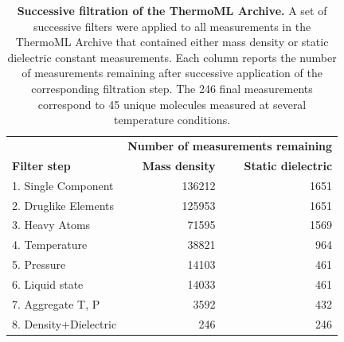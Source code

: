 \documentclass[journal=jacsat,manuscript=article]{achemso}
\begin{document}

\begin{table}
\begin{tabular}{lrr}
\hline
 &  \multicolumn{2}{c}{\bf Number of measurements remaining} \\ \cline{2-3}
{\bf Filter step} &  {\bf Mass density} &  {\bf Static dielectric} \\ 
\hline
1.  Single Component   &               136212 &                                     1651 \\
2.  Druglike Elements  &               125953 &                                     1651 \\
3.  Heavy Atoms        &                71595 &                                     1569 \\
4.  Temperature        &                38821 &                                      964 \\
5.  Pressure           &                14103 &                                      461 \\
6.  Liquid state       &                14033 &                                      461 \\
7.  Aggregate T, P     &                 3592 &                                      432 \\
8.  Density+Dielectric &                  246 &                                      246 \\

\hline
\end{tabular}
\caption{{\bf Successive filtration of the ThermoML Archive.}
A set of successive filters were applied to all measurements in the ThermoML Archive that contained either mass density or static dielectric constant measurements.
Each column reports the number of measurements remaining after successive application of the corresponding filtration step.  
The 246 final measurements correspond to 45 unique molecules measured at several temperature conditions.  
}
\label{table:ThermoMLSummary}
\end{table}
\end{document}
